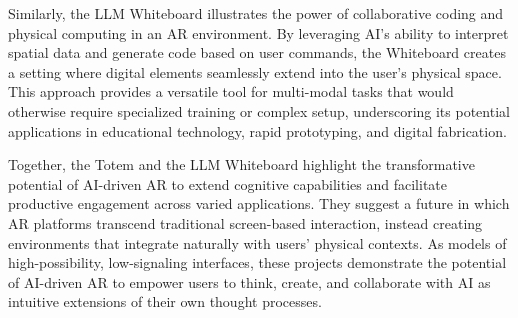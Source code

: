 Similarly, the LLM Whiteboard illustrates the power of collaborative coding and physical computing in an AR environment.
By leveraging AI’s ability to interpret spatial data and generate code based on user commands, the Whiteboard creates a setting where digital elements seamlessly extend into the user’s physical space.
This approach provides a versatile tool for multi-modal tasks that would otherwise require specialized training or complex setup, underscoring its potential applications in educational technology, rapid prototyping, and digital fabrication.

Together, the Totem and the LLM Whiteboard highlight the transformative potential of AI-driven AR to extend cognitive capabilities and facilitate productive engagement across varied applications.
They suggest a future in which AR platforms transcend traditional screen-based interaction, instead creating environments that integrate naturally with users’ physical contexts.
As models of high-possibility, low-signaling interfaces, these projects demonstrate the potential of AI-driven AR to empower users to think, create, and collaborate with AI as intuitive extensions of their own thought processes.%
